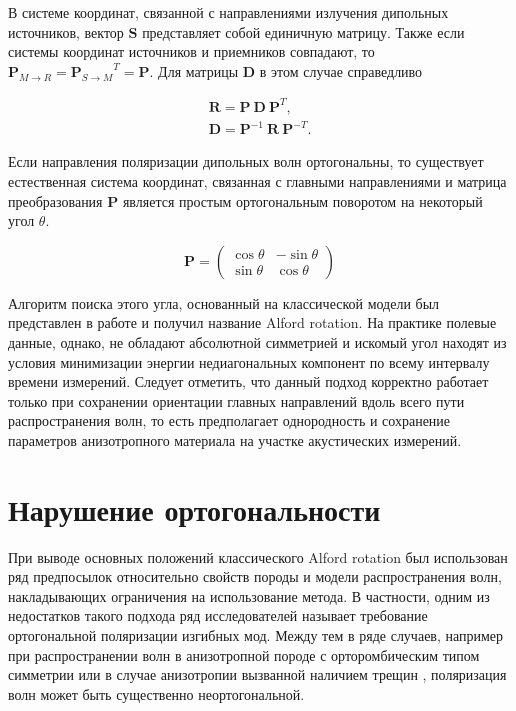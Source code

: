 \documentclass[a4paper,11pt]{article}
\begin{document}
В системе координат, связанной с направлениями излучения дипольных источников, вектор $\mathbf{S}$ представляет собой единичную матрицу. Также если системы координат источников и приемников совпадают, то $\mathbf{P}_{M \rightarrow R}={\mathbf{P}_{S \rightarrow M}}^{T} = \mathbf{P}$. Для матрицы $\mathbf{D}$ в этом случае справедливо

\begin{gather}
	\mathbf{R} = \mathbf{P} \ \mathbf{D} \ \mathbf{P}^T, \label{eq:alford_symmetric} \\ 
	\mathbf{D} = \mathbf{P}^{-1} \ \mathbf{R} \ \mathbf{P}^{-T}.
\end{gather}

Если направления поляризации дипольных волн ортогональны, то существует естественная система координат, связанная с главными направлениями и матрица преобразования $\mathbf{P}$ является простым ортогональным поворотом на некоторый угол $\theta$. 

\begin{equation*}
	\mathbf{P} = \left(
	\begin{array}{cc}
	\cos \theta &-\sin \theta \\ 
	\sin \theta & \cos \theta
	\end{array} 
	\right) 
\end{equation*}

Алгоритм поиска этого угла, основанный на классической модели был представлен в работе \cite{Alford1986} и получил название Alford rotation. На практике полевые данные, однако, не обладают абсолютной симметрией и искомый угол находят из условия минимизации энергии недиагональных компонент по всему интервалу времени измерений. Следует отметить, что данный подход корректно работает только при сохранении ориентации главных направлений вдоль всего пути распространения волн, то есть предполагает однородность и сохранение параметров анизотропного материала на участке акустических измерений.

\section{Нарушение ортогональности}

При выводе основных положений классического Alford rotation был использован ряд предпосылок относительно свойств породы и модели распространения волн, накладывающих ограничения на использование метода. В частности, одним из недостатков такого подхода ряд исследователей называет требование ортогональной поляризации изгибных мод. Между тем в ряде случаев, например при распространении волн в анизотропной породе с орторомбическим типом симметрии \cite{Dellinger2001} или в случае анизотропии вызванной наличием трещин \cite{Nolte1996}, поляризация волн может быть существенно неортогональной. 
\end{document}
